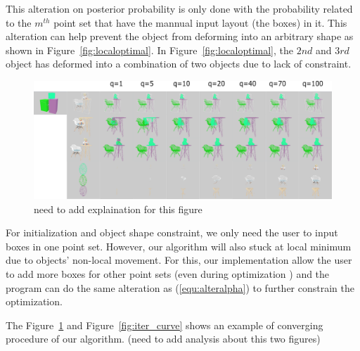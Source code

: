 This alteration on posterior probability is only done with the probability related to the $m^{th}$ point set that have the mannual input layout (the boxes) in it. This alteration can help prevent the object from deforming into an arbitrary shape as shown in Figure~\ref{fig:localoptimal}. In Figure~\ref{fig:localoptimal}, the $2nd$ and $3rd$ object has deformed into a combination of two objects due to lack of constraint.
\begin{figure}[htb]
	\centering
	\includegraphics[width=\linewidth]{images/Initialization/iters}
	\caption{\label{fig:iter}need to add explaination for this figure}
\end{figure}
For initialization and object shape constraint, we only need the user to input boxes in one point set. However, our algorithm will also stuck at local minimum due to objects' non-local movement. For this, our implementation allow the user to add more boxes for other point sets (even during optimization ) and the program can do the same alteration as (\ref{equ:alteralpha}) to further constrain the optimization.

The Figure~\ref{fig:iter} and Figure~\ref{fig:iter_curve}  shows an example of converging procedure of our algorithm. (need to add analysis about this two figures)

